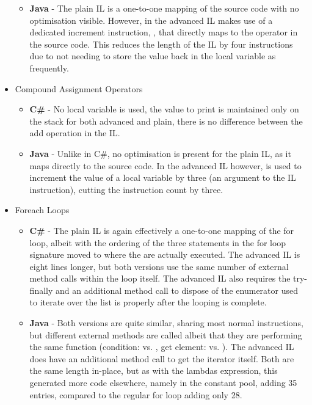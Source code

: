 \documentclass{article}
\begin{document}
\begin{itemize}
\begin{itemize}
                \item \textbf{Java} - The plain IL is a one-to-one mapping of the source code with no optimisation visible. However, in the advanced IL makes use of a dedicated increment instruction, , that directly maps to the \codeword{++} operator in the source code. This reduces the length of the IL by four instructions due to not needing to store the value back in the local variable as frequently.
            \end{itemize}
            \item Compound Assignment Operators
            \begin{itemize}
                \item \textbf{C\#} - No local variable is used, the value to print is maintained only on the stack for both advanced and plain, there is no difference between the add operation in the IL.
                \item \textbf{Java} - Unlike in C\#, no optimisation is present for the plain IL, as it maps directly to the source code. In the advanced IL however,  is used to increment the value of a local variable by three (an argument to the IL instruction), cutting the instruction count by three.
            \end{itemize}
            \item Foreach Loops
            \begin{itemize}
                \item \textbf{C\#} - The plain IL is again effectively a one-to-one mapping of the for loop, albeit with the ordering of the three statements in the for loop signature moved to where the are actually executed. The advanced IL is eight lines longer, but both versions use the same number of external method calls within the loop itself. The advanced IL also requires the try-finally and an additional method call to dispose of the enumerator used to iterate over the list is properly after the looping is complete.
                \item \textbf{Java} - Both versions are quite similar, sharing most normal instructions, but different external methods are called albeit that they are performing the same function (condition:  vs. , get element:  vs. ). The advanced IL does have an additional method call to get the iterator itself. Both are the same length in-place, but as with the lambdas expression, this generated more code elsewhere, namely in the constant pool, adding 35 entries, compared to the regular for loop adding only 28.
            \end{itemize}
        \end{itemize}
\newpage
\end{document}
